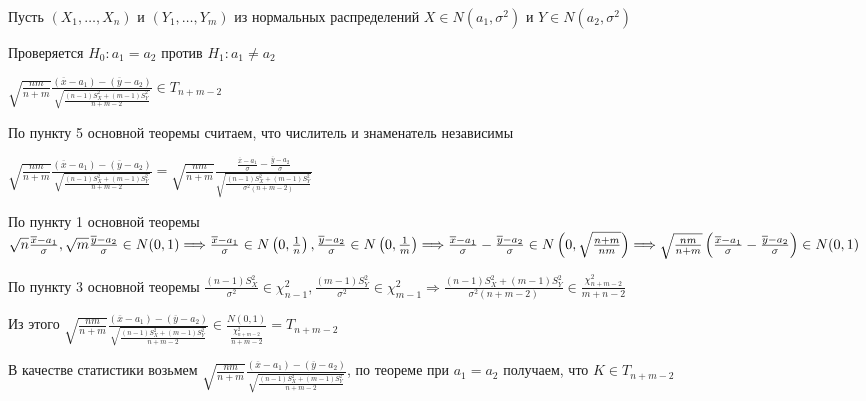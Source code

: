 \begin{enumerate}
    Пусть $(X_1, \dots, X_n)$ и $(Y_1, \dots, Y_m)$ из нормальных распределений $X \in N(a_1, \sigma^2)$ и $Y \in N(a_2, \sigma^2)$

    Проверяется $H_0 : a_1 = a_2$ против $H_1 : a_1 \neq a_2$

    \begin{MyTheorem}
        \Ths $\sqrt{\frac{nm}{n + m}} \frac{(\overline x - a_1) - (\overline y - a_2)}{\sqrt{\frac{(n - 1) S_X^2 + (m - 1) S^2_Y}{n + m - 2}}} \in T_{n + m - 2}$
    \end{MyTheorem}

    \begin{MyProof}
        По пункту 5 основной теоремы считаем, что числитель и знаменатель независимы 

        $\sqrt{\frac{nm}{n + m}} \frac{(\overline x - a_1) - (\overline y - a_2)}{\sqrt{\frac{(n - 1) S_X^2 + (m - 1) S^2_Y}{n + m - 2}}} = 
        \sqrt{\frac{nm}{n + m}} \frac{\frac{\overline x - a_1}{\sigma} - \frac{\overline y - a_2}{\sigma}}{\sqrt{\frac{(n - 1) S_X^2 + (m - 1) S^2_Y}{\sigma^2 (n + m - 2)}}}$

        По пункту 1 основной теоремы $\sqrt{n} \frac{\overline x - a_1}{\sigma}, \sqrt{m} \frac{\overline y - a_2}{\sigma} \in N(0, 1) \Longrightarrow \\
        \frac{\overline x - a_1}{\sigma} \in N\left(0, \frac{1}{n}\right), \frac{\overline y - a_2}{\sigma} \in N\left(0, \frac{1}{m}\right) \Longrightarrow \\
        \frac{\overline x - a_1}{\sigma} - \frac{\overline y - a_2}{\sigma} \in N\left(0, \sqrt{\frac{n + m}{nm}}\right) \Longrightarrow \\
        \sqrt{\frac{nm}{n + m}} \left(\frac{\overline x - a_1}{\sigma} - \frac{\overline y - a_2}{\sigma}\right) \in N(0, 1)$

        По пункту 3 основной теоремы $\frac{(n - 1)S^2_X}{\sigma^2} \in \chi^2_{n - 1}, \frac{(m - 1)S^2_Y}{\sigma^2} \in \chi^2_{m - 1} \Longrightarrow
        \frac{(n - 1) S_X^2 + (m - 1) S^2_Y}{\sigma^2 (n + m - 2)} \in \frac{\chi^2_{n + m - 2}}{m + n - 2}$

        Из этого $\sqrt{\frac{nm}{n + m}} \frac{(\overline x - a_1) - (\overline y - a_2)}{\sqrt{\frac{(n - 1) S_X^2 + (m - 1) S^2_Y}{n + m - 2}}} \in \frac{N(0, 1)}{\frac{\chi^2_{n + m - 2}}{n + m - 2}} = T_{n + m - 2}$
    \end{MyProof}

    В качестве статистики возьмем $\sqrt{\frac{nm}{n + m}} \frac{(\overline x - a_1) - (\overline y - a_2)}{\sqrt{\frac{(n - 1) S_X^2 + (m - 1) S^2_Y}{n + m - 2}}}$, 
    по теореме при $a_1 = a_2$ получаем, что $K \in T_{n + m - 2}$


\end{enumerate}
